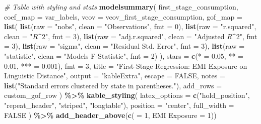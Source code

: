 \documentclass[
]{article}
\newenvironment{Shaded}{\begin{snugshade}}{\end{snugshade}}
\newcommand{\AttributeTok}[1]{\textcolor[rgb]{0.13,0.29,0.53}{#1}}
\newcommand{\CommentTok}[1]{\textcolor[rgb]{0.56,0.35,0.01}{\textit{#1}}}
\newcommand{\ConstantTok}[1]{\textcolor[rgb]{0.56,0.35,0.01}{#1}}
\newcommand{\DecValTok}[1]{\textcolor[rgb]{0.00,0.00,0.81}{#1}}
\newcommand{\FloatTok}[1]{\textcolor[rgb]{0.00,0.00,0.81}{#1}}
\newcommand{\FunctionTok}[1]{\textcolor[rgb]{0.13,0.29,0.53}{\textbf{#1}}}
\newcommand{\NormalTok}[1]{#1}
\newcommand{\OtherTok}[1]{\textcolor[rgb]{0.56,0.35,0.01}{#1}}
\newcommand{\SpecialCharTok}[1]{\textcolor[rgb]{0.81,0.36,0.00}{\textbf{#1}}}
\newcommand{\StringTok}[1]{\textcolor[rgb]{0.31,0.60,0.02}{#1}}
\begin{document}
\begin{Shaded}
\begin{Highlighting}[]
\CommentTok{\# Table with styling and stats}
\FunctionTok{modelsummary}\NormalTok{(}
\NormalTok{    first\_stage\_consumption, }\AttributeTok{coef\_map =}\NormalTok{ var\_labels, }\AttributeTok{vcov =}\NormalTok{ vcov\_first\_stage\_consumption,}
    \AttributeTok{gof\_map =} \FunctionTok{list}\NormalTok{(}
        \FunctionTok{list}\NormalTok{(}\AttributeTok{raw =} \StringTok{"nobs"}\NormalTok{, }\AttributeTok{clean =} \StringTok{"Observations"}\NormalTok{, }\AttributeTok{fmt =} \DecValTok{0}\NormalTok{),}
        \FunctionTok{list}\NormalTok{(}\AttributeTok{raw =} \StringTok{"r.squared"}\NormalTok{, }\AttributeTok{clean =} \StringTok{"$R\^{}2$"}\NormalTok{, }\AttributeTok{fmt =} \DecValTok{3}\NormalTok{),}
        \FunctionTok{list}\NormalTok{(}\AttributeTok{raw =} \StringTok{"adj.r.squared"}\NormalTok{, }\AttributeTok{clean =} \StringTok{"Adjusted $R\^{}2$"}\NormalTok{, }\AttributeTok{fmt =} \DecValTok{3}\NormalTok{),}
        \FunctionTok{list}\NormalTok{(}\AttributeTok{raw =} \StringTok{"sigma"}\NormalTok{, }\AttributeTok{clean =} \StringTok{"Residual Std. Error"}\NormalTok{, }\AttributeTok{fmt =} \DecValTok{3}\NormalTok{),}
        \FunctionTok{list}\NormalTok{(}\AttributeTok{raw =} \StringTok{"statistic"}\NormalTok{, }\AttributeTok{clean =} \StringTok{"Model\textquotesingle{}s F{-}Statistic"}\NormalTok{, }\AttributeTok{fmt =} \DecValTok{2}\NormalTok{)}
\NormalTok{    ),}
    \AttributeTok{stars =} \FunctionTok{c}\NormalTok{(}\StringTok{\textasciigrave{}}\AttributeTok{*}\StringTok{\textasciigrave{}} \OtherTok{=} \FloatTok{0.05}\NormalTok{, }\StringTok{\textasciigrave{}}\AttributeTok{**}\StringTok{\textasciigrave{}} \OtherTok{=} \FloatTok{0.01}\NormalTok{, }\StringTok{\textasciigrave{}}\AttributeTok{***}\StringTok{\textasciigrave{}} \OtherTok{=} \FloatTok{0.001}\NormalTok{),}
    \AttributeTok{fmt =} \DecValTok{3}\NormalTok{, }\AttributeTok{title =} \StringTok{"First{-}Stage Regression: EMI Exposure on Linguistic Distance"}\NormalTok{,}
    \AttributeTok{output =} \StringTok{"kableExtra"}\NormalTok{, }\AttributeTok{escape =} \ConstantTok{FALSE}\NormalTok{, }\AttributeTok{notes =} \FunctionTok{list}\NormalTok{(}\StringTok{"Standard errors clustered by state in parentheses."}\NormalTok{),}
    \AttributeTok{add\_rows =}\NormalTok{ custom\_gof\_row}
\NormalTok{) }\SpecialCharTok{\%\textgreater{}\%}
    \FunctionTok{kable\_styling}\NormalTok{(}
        \AttributeTok{latex\_options =} \FunctionTok{c}\NormalTok{(}\StringTok{"hold\_position"}\NormalTok{, }\StringTok{"repeat\_header"}\NormalTok{, }\StringTok{"striped"}\NormalTok{, }\StringTok{"longtable"}\NormalTok{),}
        \AttributeTok{position =} \StringTok{"center"}\NormalTok{, }\AttributeTok{full\_width =} \ConstantTok{FALSE}
\NormalTok{    ) }\SpecialCharTok{\%\textgreater{}\%}
    \FunctionTok{add\_header\_above}\NormalTok{(}\FunctionTok{c}\NormalTok{(}\StringTok{\textasciigrave{}}\AttributeTok{ }\StringTok{\textasciigrave{}} \OtherTok{=} \DecValTok{1}\NormalTok{, }\StringTok{\textasciigrave{}}\AttributeTok{EMI Exposure}\StringTok{\textasciigrave{}} \OtherTok{=} \DecValTok{1}\NormalTok{))}
\end{Highlighting}
\end{Shaded}
\end{document}
